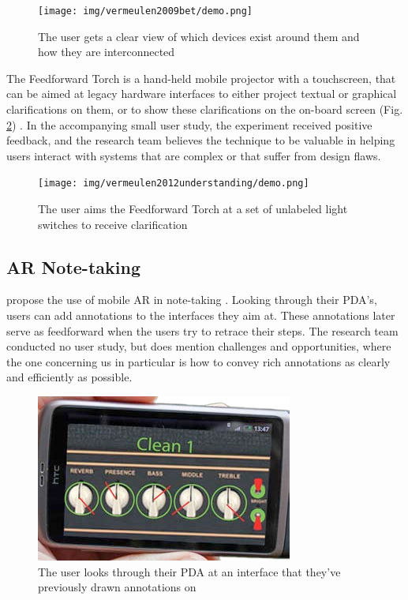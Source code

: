 \documentclass[a4paper]{article}
\begin{document}
	\begin{figure}
		\centering
		\texttt{[image: img/vermeulen2009bet/demo.png]}
		\caption{The user gets a clear view of which devices exist around them and how they are interconnected \cite{vermeulen2009bet}}
		\label{fig:vermeulen2009bet_demo}
	\end{figure}
	
	The Feedforward Torch is a hand-held mobile projector with a touchscreen, that can be aimed at legacy hardware interfaces to either project textual or graphical clarifications on them, or to show these clarifications on the on-board screen (Fig. \ref{fig:vermeulen2012understanding_demo}) \cite{vermeulen2012understanding}. In the accompanying small user study, the experiment received positive feedback, and the research team believes the technique to be valuable in helping users interact with systems that are complex or that suffer from design flaws.
	
	\begin{figure}
		\centering
		\texttt{[image: img/vermeulen2012understanding/demo.png]}
		\caption{The user aims the Feedforward Torch at a set of unlabeled light switches to receive clarification \cite{vermeulen2012understanding}}
		\label{fig:vermeulen2012understanding_demo}
	\end{figure}

	\subsection{AR Note-taking} \label{subsection_ar_note-taking}
	\citeauthor{liu2011mobile} propose the use of mobile AR in note-taking \cite{liu2011mobile}. Looking through their PDA's, users can add annotations to the interfaces they aim at. These annotations later serve as feedforward when the users try to retrace their steps. The research team conducted no user study, but does mention challenges and opportunities, where the one concerning us in particular is how to convey rich annotations as clearly and efficiently as possible.
	
	\begin{figure}
		\centering
		\includegraphics[width=0.7\linewidth]{img/liu2011mobile/demo.png}
		\caption{The user looks through their PDA at an interface that they've previously drawn annotations on \cite{liu2011mobile}}
		\label{fig:liu2011mobile_demo}
	\end{figure}
	
\end{document}
